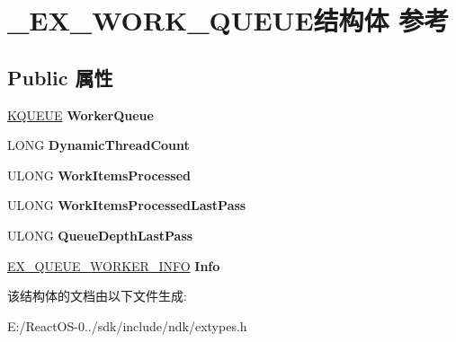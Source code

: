\hypertarget{struct___e_x___w_o_r_k___q_u_e_u_e}{}\section{\+\_\+\+E\+X\+\_\+\+W\+O\+R\+K\+\_\+\+Q\+U\+E\+U\+E结构体 参考}
\label{struct___e_x___w_o_r_k___q_u_e_u_e}
\subsection*{Public 属性}
\begin{DoxyCompactItemize}
\item 
\mbox{\label{struct___e_x___w_o_r_k___q_u_e_u_e_ad901c4ed6f29751f948be5d1c0f12988}} 
\hyperlink{struct___k_q_u_e_u_e}{K\+Q\+U\+E\+UE} {\bfseries Worker\+Queue}
\item 
\mbox{\label{struct___e_x___w_o_r_k___q_u_e_u_e_ab81b8e663e27dbc474dcaef158deab54}} 
L\+O\+NG {\bfseries Dynamic\+Thread\+Count}
\item 
\mbox{\label{struct___e_x___w_o_r_k___q_u_e_u_e_ae32cd37dd282c951db0860551a44b509}} 
U\+L\+O\+NG {\bfseries Work\+Items\+Processed}
\item 
\mbox{\label{struct___e_x___w_o_r_k___q_u_e_u_e_a3158920ad5db1edc3ad2b43f73e5adb3}} 
U\+L\+O\+NG {\bfseries Work\+Items\+Processed\+Last\+Pass}
\item 
\mbox{\label{struct___e_x___w_o_r_k___q_u_e_u_e_a908b24f7cd92eb2c99464a12cf502e6c}} 
U\+L\+O\+NG {\bfseries Queue\+Depth\+Last\+Pass}
\item 
\mbox{\label{struct___e_x___w_o_r_k___q_u_e_u_e_a7af48aa295162b78a8c7f9699862d180}} 
\hyperlink{struct___e_x___q_u_e_u_e___w_o_r_k_e_r___i_n_f_o}{E\+X\+\_\+\+Q\+U\+E\+U\+E\+\_\+\+W\+O\+R\+K\+E\+R\+\_\+\+I\+N\+FO} {\bfseries Info}
\end{DoxyCompactItemize}


该结构体的文档由以下文件生成\+:\begin{DoxyCompactItemize}
\item 
E\+:/\+React\+O\+S-\/0../sdk/include/ndk/extypes.\+h\end{DoxyCompactItemize}
